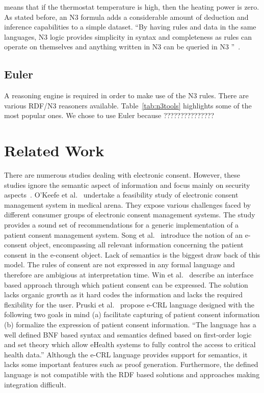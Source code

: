 \documentclass[conference]{IEEEtran}
\begin{document}
means that if the thermostat temperature is high, then the heating power is zero. As stated before, an N3 formula adds a considerable amount of deduction and
inference capabilities to a simple dataset.  “By having rules and data in the same
languages, N3 logic provides simplicity in syntax and completeness as rules can operate on themselves and anything written in N3 can be queried in N3
”~\cite{berners-lee2008}.


\subsection{Euler}

A reasoning engine is required in order to make use of the N3 rules.  There are various RDF/N3 reasoners available.
Table~\ref{tab:n3tools} highlights some of the most popular ones. We chose to use Euler because ???????????????


\section{Related Work}
\label{rel-work}

There are numerous studies dealing with electronic consent. However, these studies ignore the semantic aspect of information and focus
mainly on security aspects~\cite{reid2003, chen2009identity, blobel2004authorisation}. O'Keefe et al.~\cite{okeefe2002implementation} undertake a feasibility
study of electronic consent management system in medical arena. They expose various challenges faced by different consumer groups of electronic consent
management systems.  The study provides a sound set of recommendations for a generic implementation of a patient consent management system.
Song et al.~\cite{song2002patient} introduce the notion of an e-consent object, encompassing all relevant information concerning the patient consent in the
e-consent object. Lack of semantics is the biggest draw back of this model.  The rules of consent are not expressed in any formal language and therefore are
ambigious at interpretation time.
Win et al.~\cite{win2002implementing} describe an interface based approach through which patient consent can be expressed.  The solution lacks organic growth as
it hard codes the information and lacks the required flexibility for the user.
Pruski et al.~\cite{pruski2010} propose e-CRL language designed with the following two goals in mind (a) facilitate capturing of patient consent information (b)
formalize the expression of patient consent information.  ``The language has a well defined BNF based syntax and semantics defined based on first-order logic
and set theory which allow eHealth systems to fully control the access to critical health data.''  Although the e-CRL language provides support for semantics,
it lacks some important features such as proof generation.  Furthermore, the defined language is not compatible with the RDF based solutions and approaches
making integration difficult.
\end{document}
